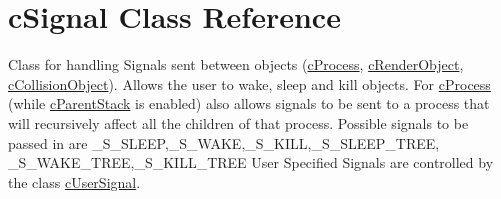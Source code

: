 \hypertarget{classc_signal}{
\section{cSignal Class Reference}
\label{classc_signal}
}


Class for handling Signals sent between objects (\hyperlink{classc_process}{cProcess}, \hyperlink{classc_render_object}{cRenderObject}, \hyperlink{classc_collision_object}{cCollisionObject}). Allows the user to wake, sleep and kill objects. For \hyperlink{classc_process}{cProcess} (while \hyperlink{classc_parent_stack}{cParentStack} is enabled) also allows signals to be sent to a process that will recursively affect all the children of that process. Possible signals to be passed in are \_\-S\_\-SLEEP,\_\-S\_\-WAKE,\_\-S\_\-KILL,\_\-S\_\-SLEEP\_\-TREE, \_\-S\_\-WAKE\_\-TREE,\_\-S\_\-KILL\_\-TREE User Specified Signals are controlled by the class \hyperlink{classc_user_signal}{cUserSignal}.  


